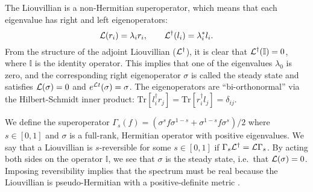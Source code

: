 \begin{comment}
Consider evolution of a density matrix via the Lindblad master equation
\begin{equation}
    \frac{d \rho}{dt} =  \mathcal{  L}(\rho) = -i [H, \rho] +  \sum_\mu \left(    L_\mu \rho  L_\mu^\dagger - \frac{1}{2} \{ L^\dagger_\mu  L_\mu, \rho \}\right).
\end{equation}
Now define the adjoint superoperator which evolves Hermitian obervables
\begin{equation} \label{eq:heisen}
    \frac{d f}{dt} =  \mathcal{  L}^\dagger(f) = +i [H, f] +  \sum_\mu \left(    L_\mu^\dagger f  L_\mu  - \frac{1}{2} \{ L^\dagger_\mu  L_\mu, f \}\right).
\end{equation}
Suppose we wish to calculate the expectation value of an observable as a function of time: $\langle A(t) \rangle$. We can either evolve the state via $\mathcal{  L}$ (Schr\"odinger picture) or the observable via $\mathcal{  L}^\dagger$ (Heisenberg picture):
\begin{equation}
\langle A(t) \rangle = \text{Tr}[ A e^{\L t} (\rho)  ] = \text{Tr}[ e^{\L^\dagger t } (A)  \rho  ].
\end{equation}
\end{comment}
The Liouvillian is a non-Hermitian superoperator, which means that each eigenvalue has right and left eigenoperators:
\begin{equation}
\mathcal{L} (r_i) = \lambda_i r_i, \qquad \mathcal{L}^\dagger (l_i) = \lambda_i^* l_i.
\end{equation}
From the structure of the adjoint Liouvillian ($\mathcal{L}^\dagger$), it is clear that $\mathcal{L}^\dagger(\mathbb{I})=0$, where $\mathbb{I}$ is the identity operator. This implies that one of the eigenvalues $\lambda_0$ is zero, and the corresponding right eigenoperator $\sigma$ is called the steady state and satisfies $\mathcal{L}(\sigma)=0$ and $e^{\mathcal{L} t} (\sigma) = \sigma$.  The eigenoperators are ``bi-orthonormal'' via the Hilbert-Schmidt inner product: $\text{Tr}[l_i^\dagger r_j] = \text{Tr}[r_i^\dagger l_j] = \delta_{ij}$.

We define the superoperator $\Gamma_s(f) = ( \sigma^s f \sigma^{1-s} + \sigma^{1-s} f \sigma^s)/2$ where $s \in[0,1]$ and $\sigma$ is a full-rank, Hermitian operator with positive eigenvalues.  We say that a Liouvillian is $s$-reversible for some $s \in[0,1]$ if
$\Gamma_s \mathcal{L}^\dag = \mathcal{L} \Gamma_s$.
By acting both sides on the operator $\mathbb{I}$, we see that $\sigma$ is the steady state, i.e.~that $\mathcal{L} (\sigma)=0$. Imposing reversibility implies that the spectrum must be real because the Liouvillian is pseudo-Hermitian with a positive-definite metric \cite{Mostafazadeh2002}.

